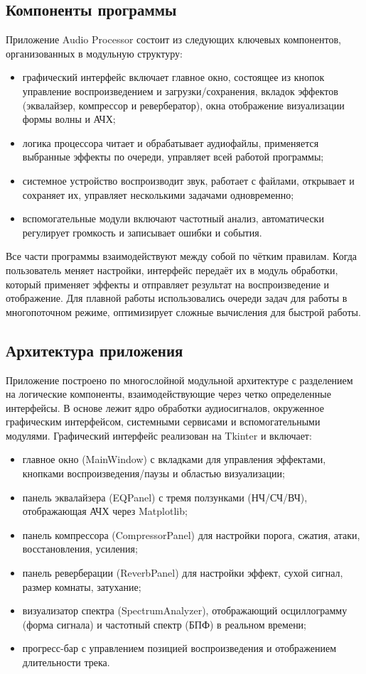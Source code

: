 \subsection{Компоненты программы}

Приложение Audio Processor состоит из следующих ключевых компонентов, организованных в модульную структуру:
\begin{itemize}
	\item графический интерфейс включает главное окно, состоящее из кнопок управление воспроизведением и загрузки/сохранения, вкладок эффектов (эквалайзер, компрессор и ревербератор), окна отображение визуализации формы волны и АЧХ;
	\item логика процессора читает и обрабатывает аудиофайлы, применяется выбранные эффекты по очереди, управляет всей работой программы;
	\item системное устройство воспроизводит звук, работает с файлами, открывает и сохраняет их, управляет несколькими задачами одновременно;
	\item вспомогательные модули включают частотный анализ, автоматически регулирует громкость и записывает ошибки и события.
\end{itemize}

Все части программы взаимодействуют между собой по чётким правилам. Когда пользователь меняет настройки, интерфейс передаёт их в модуль обработки, который применяет эффекты и отправляет результат на воспроизведение и отображение. Для плавной работы использовались очереди задач для работы в многопоточном режиме, оптимизирует сложные вычисления для быстрой работы.

\subsection{Архитектура приложения}
Приложение построено по многослойной модульной архитектуре с разделением на логические компоненты, взаимодействующие через четко определенные интерфейсы. В основе лежит ядро обработки аудиосигналов, окруженное графическим интерфейсом, системными сервисами и вспомогательными модулями.
Графический интерфейс реализован на Tkinter и включает:
\begin{itemize}
	\item главное окно (MainWindow) с вкладками для управления эффектами, кнопками воспроизведения/паузы и областью визуализации;
	\item панель эквалайзера (EQPanel) с тремя ползунками (НЧ/СЧ/ВЧ), отображающая АЧХ через Matplotlib;
	\item панель компрессора (CompressorPanel) для настройки порога, сжатия, атаки, восстановления, усиления;
	\item панель реверберации (ReverbPanel) для настройки эффект, сухой сигнал, размер комнаты, затухание;
	\item визуализатор спектра (SpectrumAnalyzer), отображающий осциллограмму (форма сигнала) и частотный спектр (БПФ) в реальном времени;
	\item прогресс-бар с управлением позицией воспроизведения и отображением длительности трека.	
\end{itemize}


